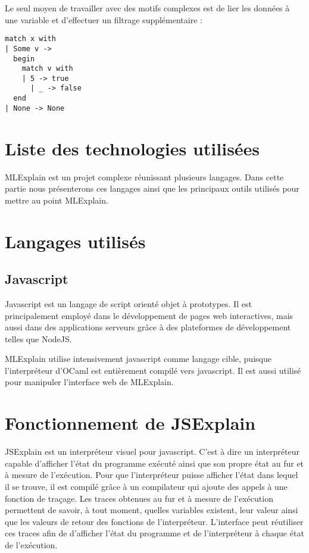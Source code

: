 \documentclass{easychair}
\begin{document}
Le seul moyen de travailler avec des motifs complexes est de lier les données à 
une variable et d'effectuer un filtrage supplémentaire :

\begin{verbatim}
match x with
| Some v ->
  begin
    match v with
    | 5 -> true
      | _ -> false
  end
| None -> None
\end{verbatim}

\section{Liste des technologies utilisées}
MLExplain est un projet complexe réunissant plusieurs langages. Dans cette 
partie nous présenterons ces langages ainsi que les principaux outils utilisés 
pour mettre au point MLExplain.

\section{Langages utilisés}
\subsection{Javascript}
Javascript est un langage de script orienté objet à prototypes. Il est 
principalement employé dans le développement de pages web interactives, mais 
aussi dans des applications serveurs grâce à des plateformes de développement 
telles que NodeJS.

MLExplain utilise intensivement javascript comme langage cible, puisque 
l'interpréteur d'OCaml est entièrement compilé vers javascript. Il est aussi 
utilisé pour manipuler l'interface web de MLExplain.



\section{Fonctionnement de JSExplain}
JSExplain est un interpréteur visuel pour javascript. C'est à dire un 
interpréteur capable d'afficher l'état du programme exécuté ainsi que son 
propre état au fur et à mesure de l'exécution. Pour que l'interpréteur puisse 
afficher l'état dans lequel il se trouve, il est compilé grâce à un compilateur 
qui ajoute des appels à une fonction de traçage. Les traces obtenues au fur et 
à mesure de l'exécution permettent de savoir, à tout moment, quelles variables 
existent, leur valeur ainsi que les valeurs de retour des fonctions de 
l'interpréteur. L'interface peut réutiliser ces traces afin de d'afficher 
l'état du programme et de l'interpréteur à chaque état de l'exécution.
\end{document}
